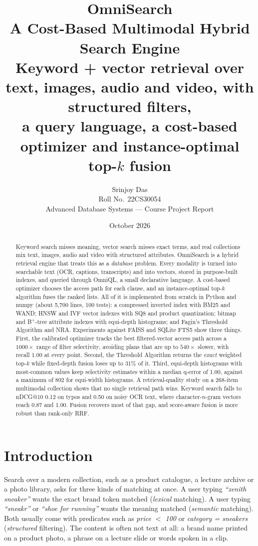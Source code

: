 \documentclass[11pt,a4paper]{article}
\title{\vspace{-1.2cm}\textbf{OmniSearch}\\[4pt]
  \large A Cost-Based Multimodal Hybrid Search Engine\\[2pt]
  \normalsize Keyword + vector retrieval over text, images, audio and video, with structured filters,\\
  a query language, a cost-based optimizer and instance-optimal top-$k$ fusion}
\author{Srinjoy Das\\[1pt] \small Roll No.\ 22CS30054\\[4pt] \small Advanced Database Systems --- Course Project Report}
\date{\small October 2026}
\begin{document}
\maketitle
\thispagestyle{empty}

\begin{abstract}
\noindent
Keyword search misses meaning, vector search misses exact terms, and real collections mix text, images,
audio and video with structured attributes. OmniSearch is a hybrid retrieval engine that treats this as a
\emph{database} problem. Every modality is turned into searchable text (OCR, captions, transcripts) and
into vectors, stored in purpose-built indexes, and queried through OmniQL, a small declarative language.
A cost-based optimizer chooses the access path for each clause, and an instance-optimal top-$k$
algorithm fuses the ranked lists. All of it is implemented from scratch in Python and numpy (about
5{,}700 lines, 100 tests): a compressed inverted index with BM25 and WAND; HNSW and IVF vector indexes
with SQ8 and product quantization; bitmap and B$^+$-tree attribute indexes with equi-depth histograms;
and Fagin's Threshold Algorithm and NRA. Experiments against FAISS and SQLite FTS5 show three things.
First, the calibrated optimizer tracks the best filtered-vector access path across a $1000\times$ range
of filter selectivity, avoiding plans that are up to $540\times$ slower, with recall 1.00 at every
point. Second, the Threshold Algorithm returns the \emph{exact} weighted top-$k$ while fixed-depth fusion
loses up to 31\% of it. Third, equi-depth histograms with most-common values keep selectivity estimates
within a median q-error of 1.00, against a maximum of 802 for equi-width histograms. A retrieval-quality
study on a 268-item multimodal collection shows that no single retrieval path wins. Keyword search falls
to nDCG@10 0.12 on typos and 0.50 on noisy OCR text, where character-$n$-gram vectors reach 0.87 and 1.00.
Fusion recovers most of that gap, and score-aware fusion is more robust than rank-only RRF.
\end{abstract}

\tableofcontents
\newpage

\section{Introduction}
\label{sec:intro}

Search over a modern collection, such as a product catalogue, a lecture archive or a photo library, asks
for three kinds of matching at once. A user typing \emph{``zenith sneaker''} wants the exact brand
token matched (\emph{lexical} matching). A user typing \emph{``sneakr''} or \emph{``shoe for running''}
wants the meaning matched (\emph{semantic} matching). Both usually come with predicates such as
\emph{price $<$ 100} or \emph{category = sneakers} (\emph{structured} filtering). The content is often
not text at all: a brand name printed on a product photo, a phrase on a lecture slide or words spoken
in a clip.
\end{document}
